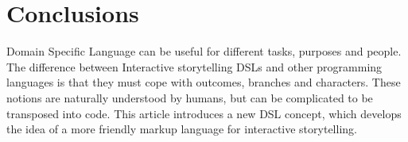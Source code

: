 \chapter*{Conclusions}

Domain Specific Language can be useful for different tasks, purposes and people. The difference between Interactive storytelling DSLs and other programming languages is that they must cope with outcomes, branches and characters. These notions are naturally understood by humans, but can be complicated to be transposed into code. This article introduces a new DSL concept, which develops the idea of a more friendly markup language for interactive storytelling. 
